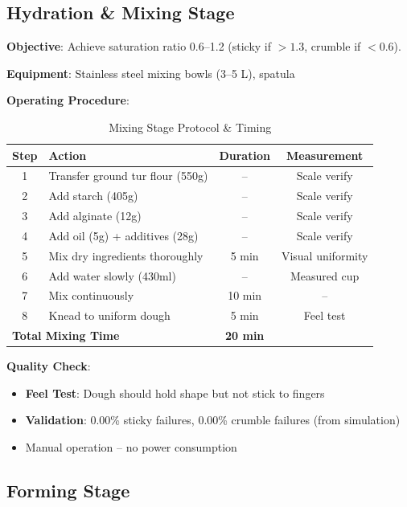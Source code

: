 \documentclass[12pt,a4paper]{article}
\begin{document}
\subsection{Hydration \& Mixing Stage}

\textbf{Objective}: Achieve saturation ratio 0.6--1.2 (sticky if $>1.3$, crumble if $<0.6$).

\textbf{Equipment}: Stainless steel mixing bowls (3--5 L), spatula

\textbf{Operating Procedure}:

\begin{table}[h]
\centering
\begin{tabular}{clcc}
\toprule
\textbf{Step} & \textbf{Action} & \textbf{Duration} & \textbf{Measurement} \\
\midrule
1 & Transfer ground tur flour (550g) & -- & Scale verify \\
2 & Add starch (405g) & -- & Scale verify \\
3 & Add alginate (12g) & -- & Scale verify \\
4 & Add oil (5g) + additives (28g) & -- & Scale verify \\
5 & Mix dry ingredients thoroughly & 5 min & Visual uniformity \\
6 & Add water slowly (430ml) & -- & Measured cup \\
7 & Mix continuously & 10 min & -- \\
8 & Knead to uniform dough & 5 min & Feel test \\
\midrule
\multicolumn{2}{l}{\textbf{Total Mixing Time}} & \textbf{20 min} & \\
\bottomrule
\end{tabular}
\caption{Mixing Stage Protocol \& Timing}
\end{table}

\textbf{Quality Check}:
\begin{itemize}
    \item \textbf{Feel Test}: Dough should hold shape but not stick to fingers
    \item \textbf{Validation}: 0.00\% sticky failures, 0.00\% crumble failures (from simulation)
    \item Manual operation -- no power consumption
\end{itemize}

\newpage

\subsection{Forming Stage}
\end{document}
